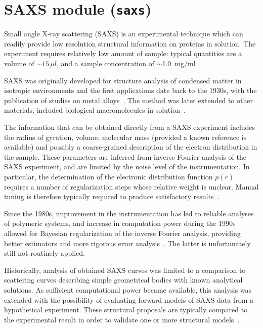 \chapter{SAXS module (\texttt{saxs})} \label{cha:saxs-module}

Small angle X-ray scattering (SAXS) is an experimental technique which
can readily provide low resolution structural information on proteins
in solution. The experiment requires relatively low amount of sample:
typical quantities are a volume of $\sim15\,\mu l$, and a sample
concentration of $\sim$1.0\, mg/ml~\cite{SvergFT-1987}.

SAXS was originally developed for structure analysis of condensed
matter in isotropic environments and the first applications date back
to the 1930s, with the publication of studies on metal
alloys~\cite{Guini-1939}. The method was later extended to other
materials, included biological macromolecules in solution~\cite{KratkG-1982}.

The information that can be obtained directly from a SAXS experiment
includes the radius of gyration, volume, molecular mass (provided a
known reference is available) and possibly a coarse-grained
description of the electron distribution in the sample. These
parameters are inferred from inverse Fourier analysis of the SAXS
experiment, and are limited by the noise level of the
instrumentation. In particular, the determination of the electronic
distribution function $p\left(r\right)$ requires a number of
regularization steps whose relative weight is unclear. Manual tuning
is therefore typically required to produce satisfactory
results~\cite{SemenS-1991}.

Since the 1980s, improvement in the instrumentation has led to
reliable analyses of polymeric systems, and increase in computation
power during the 1990s allowed for Bayesian regularization of the
inverse Fourier analysis, providing better estimators and more
rigorous error analysis~\cite{Hanse-1990}.  The latter is
unfortunately still not routinely applied.

Historically, analysis of obtained SAXS curves was limited to a
comparison to scattering curves describing simple geometrical bodies
with known analytical solutions. As sufficient computational power
became available, this analysis was extended with the possibility of
evaluating forward models of SAXS data from a hypothetical
experiment. These structural proposals are typically compared to the
experimental result in order to validate one or more structural
models~\cite{KochVS-2003,KratkG-1982,SvergFT-1987}.

